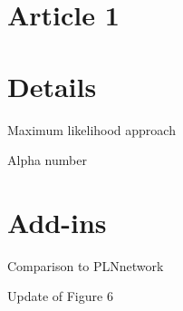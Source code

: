 \section{Article 1}
\section{Details}
Maximum likelihood approach

Alpha number


\section{Add-ins}
Comparison to PLNnetwork

Update of Figure 6